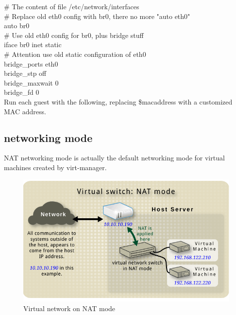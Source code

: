 \# The content of file /etc/network/interfaces\\
\# Replace old eth0 config with br0, there no more "auto eth0" \\
auto br0\\
\# Use old eth0 config for br0, plus bridge stuff\\
iface br0 inet static\\
	\indent\indent \# Attention use old static configuration of eth0\\
	\indent\indent bridge\_ports    eth0\\
	\indent\indent bridge\_stp      off\\
	\indent\indent bridge\_maxwait  0\\
	\indent\indent bridge\_fd       0\\
	
Run each guest with the following, replacing \$macaddress with a customized MAC address.

\subsection{networking mode}
NAT networking mode is actually the default networking mode for virtual machines created by virt-manager.
\begin{figure}[htb]
	\centering
		\includegraphics[scale=0.5]{Figures/Figure10.png}
	\caption[Virtual network on NAT mode]{Virtual network on NAT mode \cite{Reference19}}
	\label{fig:Virtual network on NAT mode}
\end{figure}


